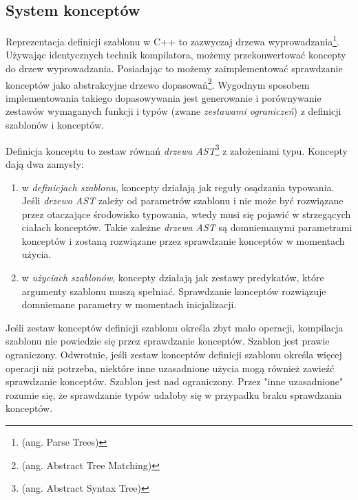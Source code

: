\documentclass[11pt, a4paper]{article}
\begin{document}
\lstset{language=C++}

\subsection{System konceptów}

Reprezentacja definicji szablonu w C++ to zazwyczaj drzewa wyprowadzania\footnote{(ang. Parse Trees)}. Używając identycznych technik kompilatora, możemy przekonwertować koncepty do drzew wyprowadzania. Posiadając to możemy zaimplementować sprawdzanie konceptów jako abstrakcyjne drzewo dopasowań\footnote{(ang. Abstract Tree Matching)}. Wygodnym sposobem implementowania takiego dopasowywania jest generowanie i porównywanie zestawów wymaganych funkcji i typów (zwane \emph{zestawami ograniczeń}) z definicji szablonów i konceptów.

Definicja konceptu to zestaw równań \emph{drzewa AST}\footnote{(ang. Abstract Syntax Tree)} z założeniami typu. Koncepty dają dwa zamysły:

\begin{enumerate}

\item w \emph{definicjach szablonu}, koncepty działają jak reguły osądzania typowania. Jeśli \emph{drzewo AST} zależy od parametrów szablonu i nie może być rozwiązane przez otaczające środowisko typowania, wtedy musi się pojawić w strzegących ciałach konceptów. Takie zależne \emph{drzewa AST} są domniemanymi parametrami konceptów i zostaną rozwiązane przez sprawdzanie konceptów w momentach użycia.

\item w \emph{użyciach szablonów}, koncepty działają jak zestawy predykatów, które argumenty szablonu muszą spełniać. Sprawdzanie konceptów rozwiązuje domniemane parametry w momentach inicjalizacji.

\end{enumerate}

Jeśli zestaw konceptów definicji szablonu określa zbyt mało operacji, kompilacja szablonu nie powiedzie się przez sprawdzanie konceptów. Szablon jest prawie ograniczony. Odwrotnie, jeśli zestaw konceptów definicji szablonu określa więcej operacji niż potrzeba, niektóre inne uzasadnione użycia mogą również zawieźć sprawdzanie konceptów. Szablon jest nad ograniczony. Przez "inne uzasadnione" rozumie się, że sprawdzanie typów udałoby się w przypadku braku sprawdzania konceptów.
\end{document}
